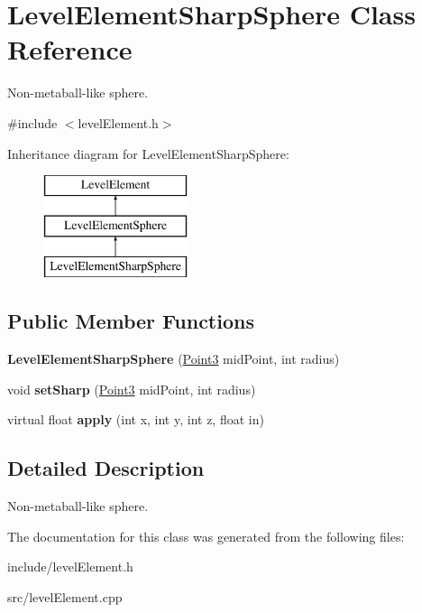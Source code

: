 \hypertarget{classLevelElementSharpSphere}{
\section{\-Level\-Element\-Sharp\-Sphere \-Class \-Reference}
\label{d2/df8/classLevelElementSharpSphere}
}


\-Non-\/metaball-\/like sphere.  




{\ttfamily \#include $<$level\-Element.\-h$>$}

\-Inheritance diagram for \-Level\-Element\-Sharp\-Sphere\-:\begin{figure}[H]
\begin{center}
\leavevmode
\includegraphics[height=3.000000cm]{d2/df8/classLevelElementSharpSphere}
\end{center}
\end{figure}
\subsection*{\-Public \-Member \-Functions}
\begin{DoxyCompactItemize}
\item 
\hypertarget{classLevelElementSharpSphere_a3343a3b947fa841d49dec5e0743df61d}{
{\bfseries \-Level\-Element\-Sharp\-Sphere} (\hyperlink{classPoint3}{\-Point3} mid\-Point, int radius)}
\label{d2/df8/classLevelElementSharpSphere_a3343a3b947fa841d49dec5e0743df61d}

\item 
\hypertarget{classLevelElementSharpSphere_a2d55f8c24daa55ea0754491a34e0cca5}{
void {\bfseries set\-Sharp} (\hyperlink{classPoint3}{\-Point3} mid\-Point, int radius)}
\label{d2/df8/classLevelElementSharpSphere_a2d55f8c24daa55ea0754491a34e0cca5}

\item 
\hypertarget{classLevelElementSharpSphere_ac4d43d9b3c66d4ca64cfc9dd7f69a0fb}{
virtual float {\bfseries apply} (int x, int y, int z, float in)}
\label{d2/df8/classLevelElementSharpSphere_ac4d43d9b3c66d4ca64cfc9dd7f69a0fb}

\end{DoxyCompactItemize}


\subsection{\-Detailed \-Description}
\-Non-\/metaball-\/like sphere. 

\-The documentation for this class was generated from the following files\-:\begin{DoxyCompactItemize}
\item 
include/level\-Element.\-h\item 
src/level\-Element.\-cpp\end{DoxyCompactItemize}
